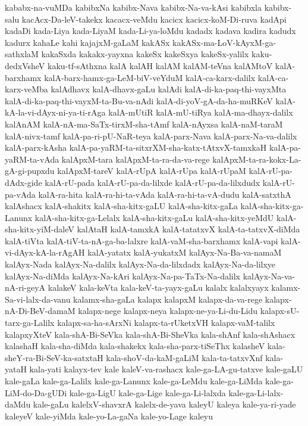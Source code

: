 {kababx-na-vuMDa
kabibxNa
kabibx-Nava
kabibx-Na-va-kAsi
kabibxla
kabibx-salu
kacAcx-Da-leV-takekx
kacacx-veMdu
kacicx
kacicx-koM-Di-ruva
kadApi
kadaDi
kada-Liya
kada-LiyaM
kada-Li-ya-loMdu
kadadx
kadava
kadira
kadudx
kadurx
kahaLe
kahi
kajajxM-gaLaM
kakASx
kakASx-ma-LoV-kAyxM-ga-sathxlaM
kakaSxda
kakakx-yayxna
kakeSx
kakeSxya
kakeSx-yalilx
kaku-dedxVsheV
kaku-tf-sAthxna
kalA
kalAH
kalAM
kalAM-teVna
kalAMtoV
kalA-barxhamx
kalA-barx-hamx-ga-LeM-biV-veYduM
kalA-ca-karx-dalilx
kalA-ca-karx-veMba
kalAdhavx
kalA-dhavx-gaLu
kalAdi
kalA-di-ka-paq-thi-vayxMta
kalA-di-ka-paq-thi-vayxM-ta-Bu-va-nAdi
kalA-di-yoV-gA-da-ha-muRKeV
kalA-kA-la-vi-dAyx-ni-ya-ti-rAga
kalA-mUtiR
kalA-mU-tiRya
kalA-ma-dhayx-dalilx
kalAnAM
kalA-nA-ma-SaTx-tirxM-sha-tAmf
kalA-nAyxsa
kalA-naM-taraM
kalA-nivx-tamf
kalA-pa-ri-pU-NaR-teya
kalA-parx-Nava
kalA-parx-Na-va-dalilx
kalA-parx-kAsha
kalA-pa-yaRM-ta-sitxrXM-sha-katx-tAtxvX-tamxkaH
kalA-pa-yaRM-ta-vAda
kalApxM-tara
kalApxM-ta-ra-da-va-rege
kalApxM-ta-ra-kokx-La-gA-gi-pupxdu
kalApxM-tareV
kalA-rUpA
kalA-rUpa
kalA-rUpaM
kalA-rU-pa-dAdx-gide
kalA-rU-pada
kalA-rU-pa-da-lilxde
kalA-rU-pa-da-lilxdudx
kalA-rU-pa-vAda
kalA-ra-hita
kalA-ra-hi-ta-vAda
kalA-ra-hi-ta-vA-dudu
kalA-satxthA
kalAshacx
kalA-shakitx
kalA-sha-kitx-gaLU
kalA-sha-kitx-gaLa
kalA-sha-kitx-ga-Lanunx
kalA-sha-kitx-ga-Lelalx
kalA-sha-kitx-gaLu
kalA-sha-kitx-yeMdU
kalA-sha-kitx-yiM-daleV
kalAtaH
kalA-tamxkA
kalA-tatatxvX
kalA-ta-tatxvX-diMda
kalA-tiVta
kalA-tiV-ta-nA-ga-ba-lalxre
kalA-vaM-sha-barxhamx
kalA-vapi
kalA-vi-dAyx-kA-la-rAgAH
kalA-yatatx
kalA-yukatxM
kalAyx-Na-Ba-va-namaM
kalAyx-Nada
kalAyx-Na-dalilx
kalAyx-Na-da-lilxdadx
kalAyx-Na-da-lilxye
kalAyx-Na-diMda
kalAyx-Na-kAri
kalAyx-Na-pa-TaTx-Na-dalilx
kalAyx-Na-va-nA-ri-geyA
kalakeV
kala-keVta
kala-keV-ta-yayx-gaLu
kalalx
kalalxyayx
kalamx-Sa-vi-lalx-da-vanu
kalamx-sha-gaLa
kalapx
kalapxM
kalapx-da-va-rege
kalapx-nA-Di-BeV-damaM
kalapx-nege
kalapx-neya
kalapx-ne-ya-Li-du-Lidu
kalapx-sU-tarx-ga-Lalilx
kalapx-sa-ha-sArxNi
kalapx-ta-rUketxVH
kalapx-vaM-talilx
kalapxyXteV
kala-shA-Bi-SeVka
kala-shA-Bi-SheVka
kala-shAnf
kala-shAshacx
kalashaH
kala-sha-diMda
kala-shakekx
kala-sha-parx-tiSeThx
kalasheV
kala-sheY-ra-Bi-SeV-ka-satxtaH
kala-shoV-da-kaM-gaLiM
kala-ta-tatxvXnf
kala-yataH
kala-yati
kalayx-tev
kale
kaleV-va-rashacx
kale-ga-LA-gu-tatxve
kale-gaLU
kale-gaLa
kale-ga-Lalilx
kale-ga-Lanunx
kale-ga-LeMdu
kale-ga-LiMda
kale-ga-LiM-do-Da-gUDi
kale-ga-LigU
kale-ga-Lige
kale-ga-Li-lalxda
kale-ga-Li-lalx-daMdu
kale-gaLu
kalelxV-shavxrA
kalelx-de-yava
kaleyU
kaleya
kale-ya-ri-yade
kaleyeV
kale-yiMda
kale-yo-La-gaNa
kale-yo-Lage
kaleyu
}
